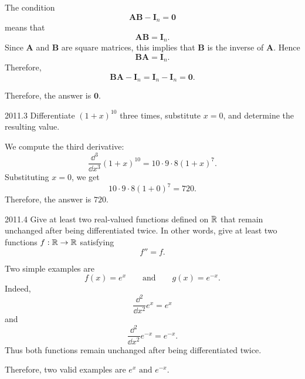     \begin{solution}
        The condition
        \[
            \mathbf{A}\mathbf{B}-\mathbf{I}_n=\mathbf{0}
        \]
        means that
        \[
            \mathbf{A}\mathbf{B}=\mathbf{I}_n.
        \]
        Since $\mathbf{A}$ and $\mathbf{B}$ are square matrices, this implies that $\mathbf{B}$ is
        the inverse of $\mathbf{A}$. Hence
        \[
            \mathbf{B}\mathbf{A}=\mathbf{I}_n.
        \]
        Therefore,
        \[
            \mathbf{B}\mathbf{A}-\mathbf{I}_n
            =
            \mathbf{I}_n-\mathbf{I}_n
            =
            \mathbf{0}.
        \]

        Therefore, the answer is $\boxed{\mathbf{0}}$.
    \end{solution}

    \begin{pastproblem}{2011.3}
        Differentiate $(1+x)^{10}$ three times, substitute $x=0$, and determine the resulting value.
    \end{pastproblem}

    \begin{solution}
        We compute the third derivative:
        \[
            \frac{\dd^3}{\dd x^3}(1+x)^{10}
            =
            10\cdot 9\cdot 8(1+x)^7.
        \]
        Substituting $x=0$, we get
        \[
            10\cdot 9\cdot 8(1+0)^7
            =
            720.
        \]
        Therefore, the answer is $\boxed{720}$.
    \end{solution}

    \begin{pastproblem}{2011.4}
        Give at least two real-valued functions defined on $\mathbb{R}$ that remain unchanged after being
        differentiated twice. In other words, give at least two functions $f:\mathbb{R}\to\mathbb{R}$ satisfying
        \[
            f''=f.
        \]
    \end{pastproblem}

    \begin{solution}
        Two simple examples are
        \[
            f(x)=e^x
            \qquad\text{and}\qquad
            g(x)=e^{-x}.
        \]
        Indeed,
        \[
            \frac{\dd^2}{\dd x^2}e^x=e^x
        \]
        and
        \[
            \frac{\dd^2}{\dd x^2}e^{-x}=e^{-x}.
        \]
        Thus both functions remain unchanged after being differentiated twice.

        Therefore, two valid examples are $\boxed{e^x\text{ and }e^{-x}}$.
    \end{solution}

